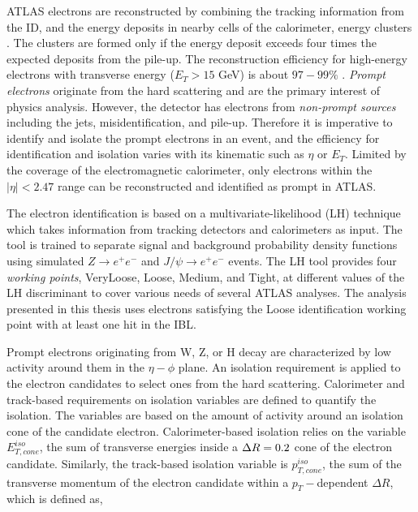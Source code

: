 ATLAS electrons are reconstructed by combining the tracking information from the ID, and the energy deposits in nearby cells of the calorimeter,  energy clusters \cite{ElectronReco}. The clusters are formed only if the energy deposit exceeds four times the expected deposits from the pile-up. The reconstruction efficiency for high-energy electrons with transverse energy ($E_{T}>15$ GeV) is about $97-99\%$ \cite{ElectronReco}. \textit{Prompt electrons} originate from the hard scattering and are the primary interest of physics analysis. However, the detector has electrons from \textit{non-prompt sources} including the jets, misidentification, and pile-up. Therefore it is imperative to identify and isolate the prompt electrons in an event, and the efficiency for identification and isolation varies with its kinematic such as $\eta$ or $E_{T}$. Limited by the coverage of the electromagnetic calorimeter, only electrons within the $|\eta| <2.47$ range can be reconstructed and identified as prompt in ATLAS.

The electron identification is based on a multivariate-likelihood (LH) technique which takes information from tracking detectors and calorimeters as input. The tool is trained to separate signal and background probability density functions using simulated $Z \rightarrow e^{+}e^{-}$ and $J / \psi \rightarrow e^{+}e^{-}$ events. The LH tool provides four \textit{working points}, VeryLoose, Loose, Medium, and Tight, at different values of the LH discriminant to cover various needs of several ATLAS analyses. The analysis presented in this thesis uses electrons satisfying the Loose identification working point with at least one hit in the IBL. 

Prompt electrons originating from W, Z, or H decay are characterized by low activity around them in the $\eta-\phi$ plane. An isolation requirement is applied to the electron candidates to select ones from the hard scattering. Calorimeter and track-based requirements on isolation variables are defined to quantify the isolation. The variables are based on the amount of activity around an isolation cone of the candidate electron. Calorimeter-based isolation relies on the variable $E_{T,cone}^{iso}$, the sum of transverse energies inside a $\Delta R=0.2$ cone of the electron candidate. Similarly, the track-based isolation variable is $p_{T,cone}^{iso}$, the sum of the transverse momentum of the electron candidate within a $p_{T}-$dependent $\Delta R$, which is defined as, 

